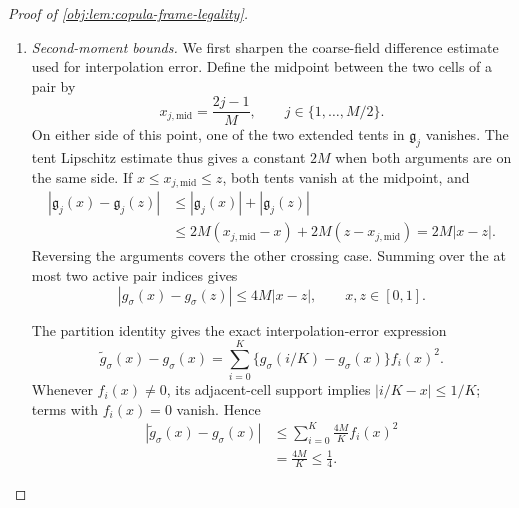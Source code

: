 \documentclass[11pt]{article}
\begin{document}
\begin{proof}[Proof of \cref{obj:lem:copula-frame-legality}]
\begin{enumerate}
Every coarse cell has the same fine-grid sample sum of its unsigned tent. More precisely, support of the extended tent and the change of index
\(i=i_{\mathrm c}r_{\mathrm{grid}}+h_{\mathrm{grid}}\) give
\[
\sum_{i=0}^{K}
 b_{\triangle,\mathrm{ext}}(Mi/K-i_{\mathrm c})
=
\sum_{h_{\mathrm{grid}}=0}^{r_{\mathrm{grid}}}
 b_\triangle(h_{\mathrm{grid}}/r_{\mathrm{grid}}),
\qquad
i_{\mathrm c}\in\{0,\ldots,M-1\}.
\]
The two cells in each signed pair therefore have equal sample sums and opposite signs. Consequently,
\[
\sum_{i=0}^{K}g_\sigma(i/K)=0,
\qquad g_\sigma(0)=g_\sigma(1)=0.
\]
In particular,
\[
\sum_{i=0}^{K-1}g_\sigma(i/K)=0,
\qquad
\sum_{i=0}^{K-1}g_\sigma((i+1)/K)=0.
\]

Integrating the sine and cosine squares over one fine cell, by an affine change of variable, gives
\[
\int_{i/K}^{(i+1)/K}\cos^2\theta_i(x)\,dx
=
\int_{i/K}^{(i+1)/K}\sin^2\theta_i(x)\,dx
=\frac1{2K}.
\]
The cell formula therefore yields
\[
\begin{aligned}
\int_0^1\widetilde g_\sigma(x)\,\lambda(dx)
&=\sum_{i=0}^{K-1}
 \frac{g_\sigma(i/K)+g_\sigma((i+1)/K)}{2K}\\
&=0.
\end{aligned}
\]

\item \textit{Second-moment bounds.}
We first sharpen the coarse-field difference estimate used for interpolation error. Define the midpoint between the two cells of a pair by
\[
x_{j,\mathrm{mid}}=\frac{2j-1}{M},
\qquad j\in\{1,\ldots,M/2\}.
\]
On either side of this point, one of the two extended tents in
\(\mathfrak g_j\) vanishes. The tent Lipschitz estimate thus gives a constant \(2M\) when both arguments are on the same side. If
\(x\le x_{j,\mathrm{mid}}\le z\), both tents vanish at the midpoint, and
\[
\begin{aligned}
|\mathfrak g_j(x)-\mathfrak g_j(z)|
&\le|\mathfrak g_j(x)|+|\mathfrak g_j(z)|\\
&\le2M(x_{j,\mathrm{mid}}-x)
     +2M(z-x_{j,\mathrm{mid}})
=2M|x-z|.
\end{aligned}
\]
Reversing the arguments covers the other crossing case. Summing over the at most two active pair indices gives
\[
|g_\sigma(x)-g_\sigma(z)|\le4M|x-z|,
\qquad x,z\in[0,1].
\]

The partition identity gives the exact interpolation-error expression
\[
\widetilde g_\sigma(x)-g_\sigma(x)
=
\sum_{i=0}^{K}
 \{g_\sigma(i/K)-g_\sigma(x)\}f_i(x)^2.
\]
Whenever \(f_i(x)\ne0\), its adjacent-cell support implies
\(|i/K-x|\le1/K\); terms with \(f_i(x)=0\) vanish. Hence
\[
\begin{aligned}
|\widetilde g_\sigma(x)-g_\sigma(x)|
&\le\sum_{i=0}^{K}\frac{4M}{K}f_i(x)^2\\
&=\frac{4M}{K}\le\frac14.
\end{aligned}
\]


\end{enumerate}
\end{proof}
\end{document}
